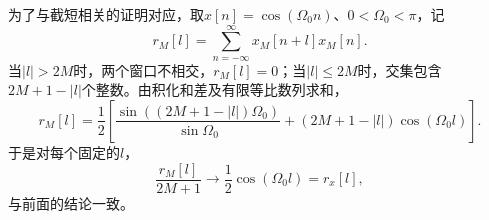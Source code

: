 为了与截短相关的证明对应，取$x[n]=\cos(\Omega_0n)$、$0<\Omega_0<\pi$，记
$$
    r_M[l]=\sum_{n=-\infty}^{\infty}x_M[n+l]x_M[n].
$$
当$|l|>2M$时，两个窗口不相交，$r_M[l]=0$；当$|l|\le2M$时，交集包含$2M+1-|l|$个整数。由积化和差及有限等比数列求和，
$$
    r_M[l]=\frac12\left[
        \frac{\sin((2M+1-|l|)\Omega_0)}{\sin\Omega_0}
        +(2M+1-|l|)\cos(\Omega_0l)\right].
$$
于是对每个固定的$l$，
$$
    \frac{r_M[l]}{2M+1}\longrightarrow\frac12\cos(\Omega_0l)=r_x[l],
$$
与前面的结论一致。
